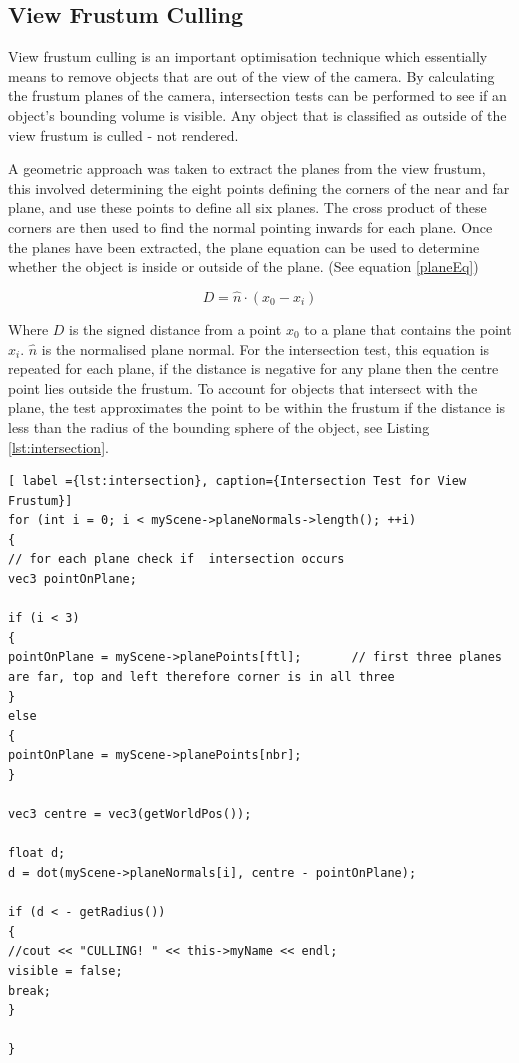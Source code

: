 \documentclass[conference]{acmsiggraph}
\begin{document}
\subsection{View Frustum Culling}
View frustum culling is an important optimisation technique which essentially means to remove objects that are out of the view of the camera. By calculating the frustum planes of the camera, intersection tests can be performed to see if an object's bounding volume is visible. Any object that is classified as outside of the view frustum is culled - not rendered.

A geometric approach was taken to extract the planes from the view frustum, this involved determining the eight points defining the corners of the near and far plane, and use these points to define all six planes. \cite{lighthouse} The cross product of these corners are then used to find the normal pointing inwards for each plane. Once the planes have been extracted, the plane equation can be used to determine whether the object is inside or outside of the plane. (See equation \ref{planeEq})

\begin{equation} \label{planeEq}
D = \hat{n}\cdot(x_0-x_i)
\end{equation}

Where $D$ is the signed distance from a point $x_0$ to a plane that contains the point $x_i$. $\hat{n}$ is the normalised plane normal. For the intersection test, this equation is repeated for each plane, if the distance is negative for any plane then the centre point lies outside the frustum. To account for objects that intersect with the plane, the test approximates the point to be within the frustum if the distance is less than the radius of the bounding sphere of the object, see Listing \ref{lst:intersection}.

\begin{lstlisting}[ label ={lst:intersection}, caption={Intersection Test for View Frustum}]
for (int i = 0; i < myScene->planeNormals->length(); ++i) 
{
// for each plane check if 	intersection occurs
vec3 pointOnPlane;

if (i < 3)
{
pointOnPlane = myScene->planePoints[ftl];		// first three planes are far, top and left therefore corner is in all three
}
else
{
pointOnPlane = myScene->planePoints[nbr];
}

vec3 centre = vec3(getWorldPos());

float d;
d = dot(myScene->planeNormals[i], centre - pointOnPlane);

if (d < - getRadius())
{
//cout << "CULLING! " << this->myName << endl;
visible = false;
break;
}

}
\end{lstlisting}
\end{document}
